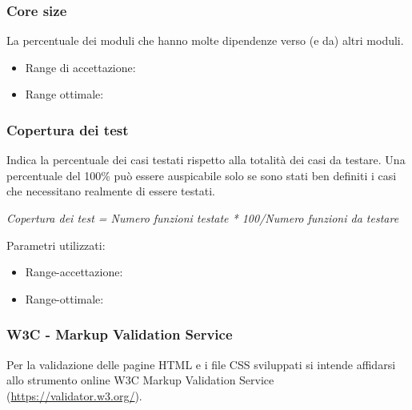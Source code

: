 \documentclass[a4paper,11pt]{article}
\begin{document}
\subsubsection{Core size}
La percentuale dei moduli che hanno molte dipendenze verso (e da) altri moduli.
\begin{itemize}
	\item Range di accettazione: \begin{math}[\le 30\%]\end{math}
	\item Range ottimale: \begin{math}[\le 25\%]\end{math}
	\end{itemize}
\subsubsection{Copertura dei test}
Indica la percentuale dei casi testati rispetto alla totalità dei casi da testare. Una percentuale del 100\% può essere auspicabile solo se sono stati ben definiti i casi che necessitano realmente di essere testati. 
\begin{center}
\textit{Copertura dei test = Numero funzioni testate * 100/Numero funzioni da testare}
\end{center}
Parametri utilizzati: 
\begin{itemize}
	\item Range-accettazione: \begin{math}[70 - 100]\end{math}
\item Range-ottimale: \begin{math}[80 - 100]\end{math}
	\end{itemize}
\subsubsection{W3C - Markup Validation Service}
Per la validazione delle pagine HTML e i file CSS sviluppati si intende affidarsi allo strumento online W3C Markup Validation Service (\url{https://validator.w3.org/}). 
\end{document}
